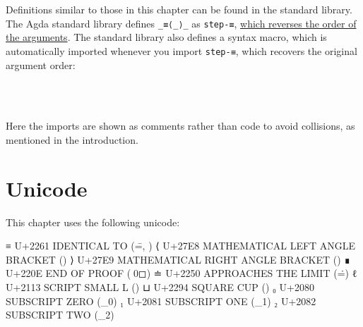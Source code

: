 Definitions similar to those in this chapter can be found in the
standard library. The Agda standard library defines \texttt{\_≡⟨\_⟩\_}
as \texttt{step-≡},
\href{https://github.com/agda/agda-stdlib/blob/master/CHANGELOG/v1.3.md\#changes-to-how-equational-reasoning-is-implemented}{which
reverses the order of the arguments}. The standard library also defines
a syntax macro, which is automatically imported whenever you import
\texttt{step-≡}, which recovers the original argument order:

\begin{fence}
\begin{code}%
\>[0]\<%
\\
\>[0]\<%
\\
\>[0]\<%
\end{code}
\end{fence}

Here the imports are shown as comments rather than code to avoid
collisions, as mentioned in the introduction.

\hypertarget{unicode}{%
\section{Unicode}\label{unicode}}

This chapter uses the following unicode:

\begin{myDisplay}
≡  U+2261  IDENTICAL TO (\==, \equiv)
⟨  U+27E8  MATHEMATICAL LEFT ANGLE BRACKET (\<)
⟩  U+27E9  MATHEMATICAL RIGHT ANGLE BRACKET (\>)
∎  U+220E  END OF PROOF (\qed)
≐  U+2250  APPROACHES THE LIMIT (\.=)
ℓ  U+2113  SCRIPT SMALL L (\ell)
⊔  U+2294  SQUARE CUP (\lub)
₀  U+2080  SUBSCRIPT ZERO (\_0)
₁  U+2081  SUBSCRIPT ONE (\_1)
₂  U+2082  SUBSCRIPT TWO (\_2)
\end{myDisplay}

